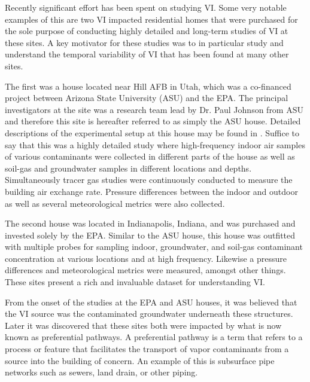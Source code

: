 \documentclass[../thesis.tex]{subfiles}
\begin{document}
Recently significant effort has been spent on studying VI.
Some very notable examples of this are two VI impacted residential homes that were purchased for the sole purpose of conducting highly detailed and long-term studies of VI at these sites.
A key motivator for these studies was to in particular study and understand the temporal variability of VI that has been found at many other sites.\par

The first was a house located near Hill AFB in Utah, which was a co-financed project between Arizona State University (ASU) and the EPA.
The principal investigators at the site was a research team lead by Dr. Paul Johnson from ASU and therefore this site is hereafter referred to as simply the ASU house.
Detailed descriptions of the experimental setup at this house may be found in .%
Suffice to say that this was a highly detailed study where high-frequency indoor air samples of various contaminants were collected in different parts of the house as well as soil-gas and groundwater samples in different locations and depths.
Simultaneously tracer gas studies were continuously conducted to measure the building air exchange rate.
Pressure differences between the indoor and outdoor as well as several meteorological metrics were also collected.\par

The second house was located in Indianapolis, Indiana, and was purchased and invested solely by the EPA.
Similar to the ASU house, this house was outfitted with multiple probes for sampling indoor, groundwater, and soil-gas contaminant concentration at various locations and at high frequency.
Likewise a pressure differences and meteorological metrics were measured, amongst other things.
These sites present a rich and invaluable dataset for understanding VI.\par

From the onset of the studies at the EPA and ASU houses, it was believed that the VI source was the contaminated groundwater underneath these structures.
Later it was discovered that these sites both were impacted by what is now known as preferential pathways.
A preferential pathway is a term that refers to a process or feature that facilitates the transport of vapor contaminants from a source into the building of concern.
An example of this is subsurface pipe networks such as sewers, land drain, or other piping.\par
\end{document}
